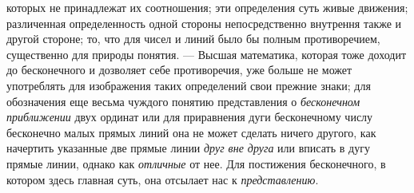 \documentclass[twoside]{article}
\begin{document}
{{которых не принадлежат их соотношения; эти определения суть живые движения;
различенная определенность одной стороны непосредственно внутрення также и
другой стороне; то, что для чисел и линий было бы полным
противоречием, существенно для природы понятия. — Высшая
математика, которая тоже доходит до бесконечного и дозволяет себе
противоречия, уже больше не может употреблять для изображения таких
определений свои прежние знаки; для обозначения еще весьма чуждого понятию
представления о {\em бесконечном
приближении} двух ординат или для приравнения дуги
бесконечному числу бесконечно малых прямых линий она не может сделать
ничего другого, как начертить указанные две прямые линии
{\em друг вне друга} или
вписать в дугу прямые линии, однако как
{\em отличные} от нее.
Для постижения бесконечного, в котором здесь главная суть, она отсылает нас
к {\em представлению}.

}}
\end{document}
